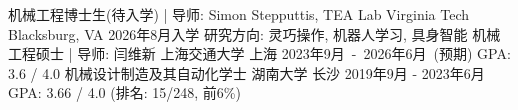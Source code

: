 
\begin{cventries}
	\cventry
	{机械工程博士生(待入学) | 导师: Simon Stepputtis, TEA Lab} %
	{Virginia Tech} %
	{Blacksburg, VA} %
	{2026年8月入学} %
	{
        研究方向: 灵巧操作, 机器人学习, 具身智能
	}%
	\cventry
	{机械工程硕士 | 导师: 闫维新} %
	{上海交通大学} %
	{上海} %
	{2023年9月~-~2026年6月~(预期)} %
	{
        GPA: 3.6 / 4.0
	}%
	\cventry
	{机械设计制造及其自动化学士} %
	{湖南大学} %
	{长沙} %
	{2019年9月 - 2023年6月} %
	{
        GPA: 3.66 / 4.0 (排名: 15/248, 前6\%)
	}%
	\vspace{2mm}
\end{cventries}
